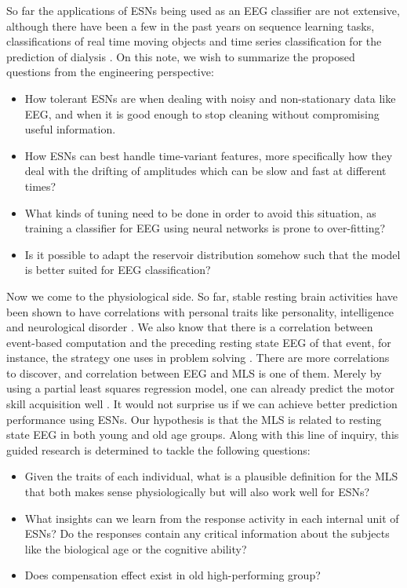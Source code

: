 \documentclass[a4paper,11pt,oneside]{article}
\begin{document}
So far the applications of ESNs being used as an EEG classifier are not extensive, although there have been a few in the past years on sequence learning tasks, classifications of real time moving objects \cite{mitul2013classification} and time series classification for the prediction of dialysis \cite{ongenae2013time}. On this note, we wish to summarize the proposed questions from the engineering perspective:
\begin{itemize}
	\item How tolerant ESNs are when dealing with noisy and non-stationary data like EEG, and when it is good enough to stop cleaning without compromising  useful information.  
	\item How ESNs can best handle time-variant features, more specifically how they deal with the drifting of amplitudes which can be slow and fast at different times?
	\item What kinds of tuning need to be done in order to avoid this situation, as training a classifier for EEG using neural networks is prone to over-fitting?
	\item Is it possible to adapt the reservoir distribution somehow such that the model is better suited for EEG classification?
\end{itemize}

Now we come to the physiological side. So far, stable resting brain activities have been shown to have correlations with personal traits like personality, intelligence and neurological disorder \cite{thatcher2005eeg}\cite{davidson2003affective}. We also know that there is a correlation between event-based computation and the preceding resting state EEG of that event, for instance, the strategy one uses in problem solving \cite{kounios2008origins}. There are more correlations to discover, and correlation between EEG and MLS is one of them. Merely by using a partial least squares regression model, one can already predict the motor skill acquisition well \cite{wu2014resting}. It would not surprise us if we can achieve better prediction performance using ESNs. Our hypothesis is that the MLS is related to resting state EEG in both young and old age groups. Along with this line of inquiry, this guided research is determined to tackle the following questions: 

\begin{itemize}
	\item Given the traits of each individual, what is a plausible definition for the MLS that both makes sense physiologically but will also work well for ESNs?
	\item What insights can we learn from the response activity in each internal unit of ESNs? Do the responses contain any critical information about the subjects like the biological age or the cognitive ability?
	\item Does compensation effect exist in old high-performing group?
\end{itemize}
\end{document}
